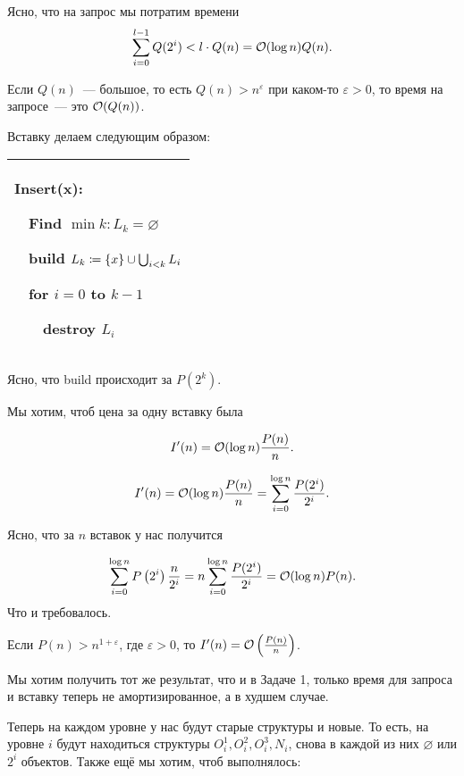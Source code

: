 Ясно, что на запрос мы потратим времени
\begin{equation*}
	\sum_{i = 0}^{l - 1}Q(2^i) < l \cdot Q(n) = \mathcal{O}(\log n)Q(n).
\end{equation*}


\begin{remark}
	Если $Q(n)$~--- большое, то есть $Q(n) > n^\varepsilon$ при каком-то $\varepsilon > 0$, то время на запросе~--- это $\mathcal{O}(Q(n))$.
\end{remark}

Вставку делаем следующим образом:


\begin{tabular}{|p{5cm}|}
	\hline
	Insert(x):

	$\quad$Find $\min k: L_k = \varnothing$

	$\quad$build $L_k \coloneqq \lbrace x\rbrace \cup \bigcup_{i < k} L_i$

	$\quad$for $i = 0$ to $k - 1$

	$\quad$$\quad$destroy $L_i$ \\

	\hline
\end{tabular}

Ясно, что build происходит за $P\left(2^k\right)$.


Мы хотим, чтоб цена за одну вставку была

\begin{equation*}
	I^\prime(n) = \mathcal{O}(\log n)\frac{P(n)}{n}.
\end{equation*}

\begin{equation*}
	I^\prime(n) = \mathcal{O}(\log n)\frac{P(n)}{n} = \sum_{i = 0}^{\log n}\frac{P(2^i)}{2^i}.
\end{equation*}

Ясно, что за $n$ вставок у нас получится

\begin{equation*}
	\sum_{i = 0}^{\log n}P\left(2^i\right)\frac{n}{2^i} = n \sum_{i = 0}^{\log n}\frac{P(2^i)}{2^i} = \mathcal{O}(\log n)P(n).
\end{equation*}
Что и требовалось.


\begin{remark}
	Если $P(n) > n^{1 + \varepsilon}$, где $\varepsilon > 0$, то $I^\prime(n) = \mathcal{O}\left(\frac{P(n)}{n}\right)$.
\end{remark}


\begin{task}
	Мы хотим получить тот же результат, что и в Задаче 1, только время для запроса и вставку теперь не амортизированное, а в худшем случае.
\end{task}
Теперь на каждом уровне у нас будут старые структуры и новые. То есть, на уровне $i$ будут находиться структуры $O_i^1, O_i^2, O_i^3, N_i$, снова в каждой из них $\varnothing$ или $2^i$ объектов. Также ещё мы хотим, чтоб выполнялось:

